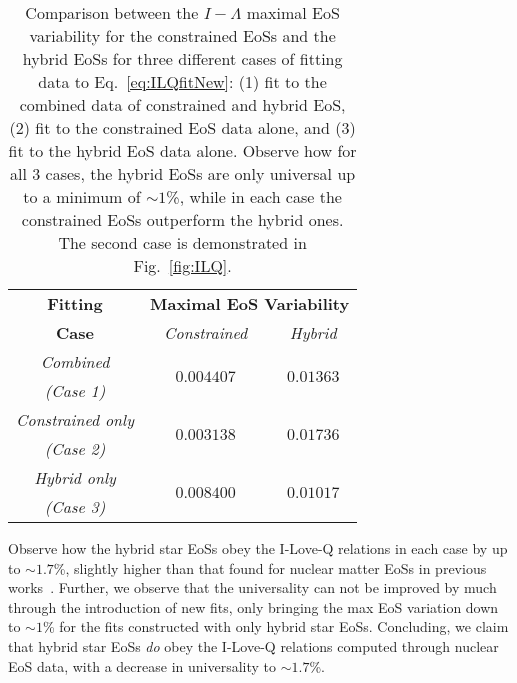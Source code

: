 \documentclass[prd,twocolumn,nofootinbib,superscriptaddress,amsmath,amssymb]{revtex4-1}
\begin{document}
\begin{table}
\centering
\caption{
Comparison between the $I-\Lambda$ maximal EoS variability for the constrained EoSs and the hybrid EoSs for three different cases of fitting data to Eq.~\ref{eq:ILQfitNew}: (1) fit to the combined data of constrained and hybrid EoS, (2) fit to the constrained EoS data alone, and (3) fit to the hybrid EoS data alone.
Observe how for all 3 cases, the hybrid EoSs are only universal up to a minimum of $\sim1$\%, while in each case the constrained EoSs outperform the hybrid ones.
The second case is demonstrated in Fig.~\ref{fig:ILQ}.
}\label{tab:hybridCompare}
\begin{tabular}{ c  || c c } 
 \hline
 \hline
 \textbf{Fitting} & \multicolumn{2}{c}{\textbf{Maximal EoS Variability}} \\
 \cline{2-3}
 \textbf{Case} &  \multicolumn{1}{c|}{\emph{Constrained}} & \emph{Hybrid}\\
 \hline
 \emph{Combined} &  \multirow{2}{*}{$0.004407$} & \multirow{2}{*}{$0.01363$}\\
 \emph{(Case 1)} & &\\
 \cline{1-1}
 \emph{Constrained only} & \multirow{2}{*}{$0.003138$} & \multirow{2}{*}{$0.01736$}\\
  \emph{(Case 2)} & &\\
  \cline{1-1}
 \emph{Hybrid only} & \multirow{2}{*}{$0.008400$} & \multirow{2}{*}{$0.01017$}\\
  \emph{(Case 3)} & &\\
  \cline{1-1}
\hline
\hline
\end{tabular}
\end{table}

Observe how the hybrid star EoSs obey the I-Love-Q relations in each case by up to $\sim1.7$\%, slightly higher than that found for nuclear matter EoSs in previous works~\cite{Yagi:ILQ}.
Further, we observe that the universality can not be improved by much through the introduction of new fits, only bringing the max EoS variation down to $\sim1$\% for the fits constructed with only hybrid star EoSs.
Concluding, we claim that hybrid star EoSs \emph{do} obey the I-Love-Q relations computed through nuclear EoS data, with a decrease in universality to $\sim1.7$\%. 
\end{document}
